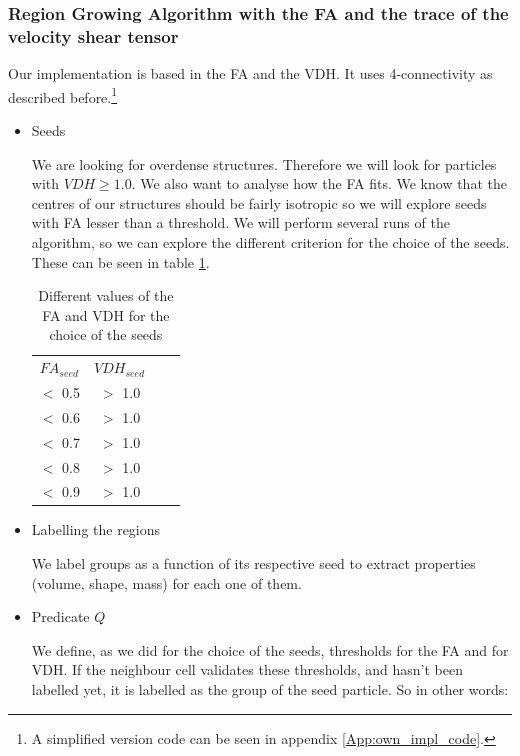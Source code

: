 \documentclass[12pt]{article}
\begin{document}
\subsubsection{Region Growing Algorithm with the FA and the trace of the velocity shear tensor}\label{sec:own_impl_descr}
Our implementation is based in the FA and the VDH. It uses 4-connectivity as described before.\footnote{
A simplified version code can be seen in appendix \ref{App:own_impl_code}.
}

\begin{itemize}
    \item Seeds
\begin{par}
We are looking for overdense structures. Therefore we will look
for particles with $VDH \geq 1.0$.  We also want to analyse how
the FA fits. We know that the centres of our structures should be
fairly isotropic so we will explore seeds with FA lesser than a
threshold. We will perform several runs of the algorithm, so we
can explore the different criterion for the choice of the seeds.
These can be seen in table \ref{tab:seeds_FA_Trace}. 
\end{par}
 \begin{table}[ht]
    \centering
    \begin{tabular}{|c|c|c|c|}
        $FA_{seed}$ & $VDH_{seed}$ \\
        $<$ 0.5 &  $>$ 1.0 \\
        $<$ 0.6 &  $>$ 1.0 \\
        $<$ 0.7 &  $>$ 1.0 \\
        $<$ 0.8 &  $>$ 1.0 \\
        $<$ 0.9 &  $>$ 1.0 \\
    \end{tabular}
    \caption{Different values of the FA and VDH for the choice of the seeds}
    \label{tab:seeds_FA_Trace}
\end{table}
\FloatBarrier

\item Labelling the regions
\begin{par}
We label groups as a function of its respective
 seed to extract properties (volume, shape, mass)
  for each one of them.
\end{par}

\item Predicate $Q$

\begin{par}
We define, as we did for the
choice of the seeds, thresholds for the FA and for VDH. If
the neighbour cell validates these thresholds, and hasn't been
labelled yet, it is labelled as the group of the seed particle. So
in other words: \\


\end{par}
\end{itemize}
\end{document}
